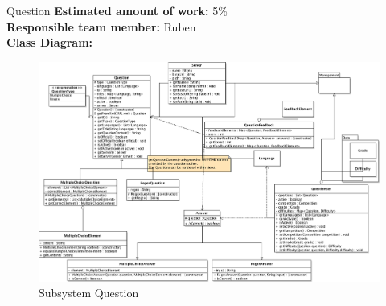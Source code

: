 \begin{subsection}{Question}
	\textbf{Estimated amount of work:} 5\% \\
	\textbf{Responsible team member:} Ruben \\
	\textbf{Class Diagram:} \\
	
	\begin{figure}[!h]
	  \centering
		\includegraphics[width=1\textwidth]{../class_diagrams/question.png}
	  \caption{Subsystem Question}
	  \label{subsystem_question}
	\end{figure}
	
\end{subsection}